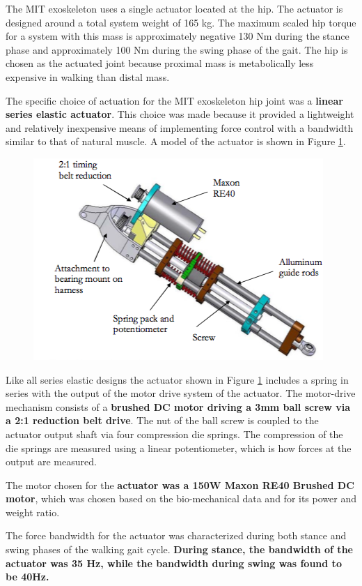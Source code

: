 The MIT exoskeleton uses a single actuator located at the hip.  The actuator is designed around a total system weight of 165 kg.  The maximum scaled hip torque for a system with this mass is approximately negative 130 Nm during the stance phase and approximately 100 Nm during the swing phase of the gait.  The hip is chosen as the actuated joint because proximal mass is metabolically less expensive in walking than distal mass.

The specific choice of actuation for the MIT exoskeleton hip joint was a {\bf linear series elastic actuator}.  This choice was made because it provided a lightweight and relatively inexpensive means of implementing force control with a bandwidth similar to that of natural muscle.  A model of the actuator is shown in Figure \ref{fig:mitSEA}.
\begin{figure}[thpb]
\centering
\includegraphics[width=3.in]{exos/figs/MIT/mitSEA}
  \caption{}
  \vspace{-0.2in}
 \label{fig:mitSEA}   
 \end{figure} 
Like all series elastic designs the actuator shown in Figure \ref{fig:mitSEA} includes a spring in series with the output of the motor drive system of the actuator.  The motor-drive mechanism consists of a {\bf brushed DC motor driving a 3mm ball screw via a 2:1 reduction belt drive}.  The nut of the ball screw is coupled to the actuator output shaft via four compression die springs.  The compression of the die springs are measured using a linear potentiometer, which is how forces at the output are measured.

The motor chosen for the {\bf actuator was a 150W Maxon RE40 Brushed DC motor}, which was chosen based on the bio-mechanical data and for its power and weight ratio.

The force bandwidth for the actuator was characterized during both stance and swing phases of the walking gait cycle.  {\bf During stance, the bandwidth of the actuator was 35 Hz, while the bandwidth during swing was found to be 40Hz.} 
 
